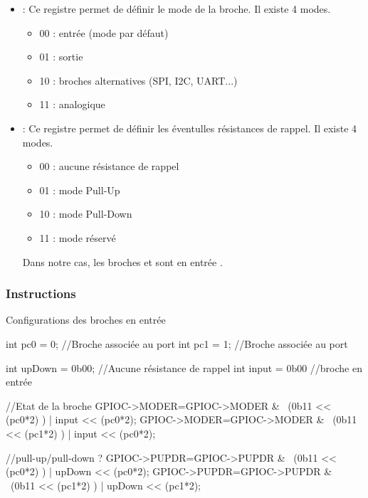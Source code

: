 \begin{itemize}

\item {} : Ce registre permet de définir le mode de la broche. Il existe 4 modes.

  \begin{itemize}
    \item 00 : entrée  (mode par défaut)
    \item 01 : sortie
    \item 10 : broches alternatives (SPI, I2C, UART...)
    \item 11 : analogique
  \end{itemize}

 \item {} : Ce registre permet de définir les éventulles résistances de rappel. Il existe 4 modes.

  \begin{itemize}
    \item 00 : aucune résistance de rappel
    \item 01 : mode Pull-Up
    \item 10 : mode Pull-Down
    \item 11 : mode réservé
  \end{itemize}

  Dans notre cas, les broches  et  sont en entrée .

\end{itemize}

\subsubsection{Instructions}

  \begin{Cpp}{Configurations des broches en entrée}

  int pc0 = 0;                //Broche associée au port
  int pc1 = 1;                //Broche associée au port

  int upDown = 0b00;   //Aucune résistance de rappel
  int input = 0b00     //broche en entrée

  //Etat de la broche
  GPIOC->MODER=GPIOC->MODER & ~(0b11 << (pc0*2) ) | input << (pc0*2); 
  GPIOC->MODER=GPIOC->MODER & ~(0b11 << (pc1*2) ) | input << (pc0*2);

  //pull-up/pull-down ?
  GPIOC->PUPDR=GPIOC->PUPDR & ~(0b11 << (pc0*2) ) | upDown << (pc0*2);
  GPIOC->PUPDR=GPIOC->PUPDR & ~(0b11 << (pc1*2) ) | upDown << (pc1*2);

\end{Cpp}


